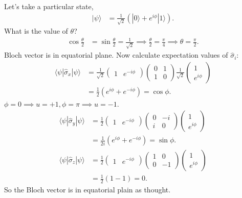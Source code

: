 \documentclass[lasers.tex]{subfiles}
\begin{document}
\begin{example}
    Let's take a particular state,
    \begin{align}
        |\psi\rangle &= \frac{1}{\sqrt{2}}\left(|0\rangle+e^{i\phi}|1\rangle\right).
    \end{align}
    What is the value of $\theta$?
    \begin{align}
        \cos\frac{\theta}{2} &= \sin\frac{\theta}{2} = \frac{1}{\sqrt{2}} \implies \frac{\theta}{2} = \frac{\pi}{4} \implies \theta = \frac{\pi}{2}.
    \end{align}
    Bloch vector is in equatorial plane. 
    Now calculate expectation values of $\hat{\sigma}_i$:
    \begin{align}
        \langle\psi|\hat{\sigma}_x|\psi\rangle &= \frac{1}{\sqrt{2}}\begin{pmatrix} 1 & e^{-i\phi}\end{pmatrix}\begin{pmatrix}0 & 1 \\ 1 & 0 \end{pmatrix}\frac{1}{\sqrt{2}}\begin{pmatrix}1 \\ e^{i\phi}\end{pmatrix} \\
                                               &= \frac12\left(e^{i\phi}+e^{-i\phi}\right) = \cos\phi.
    \end{align}
    $\phi=0\implies u=+1, \phi=\pi \implies u=-1$.
    \begin{align}
        \langle\psi|\hat{\sigma}_y|\psi\rangle &= \frac12\begin{pmatrix}1 & e^{-i\phi}\end{pmatrix}\begin{pmatrix}0 & -i \\ i & 0\end{pmatrix}\begin{pmatrix} 1 \\ e^{i\phi}\end{pmatrix} \\
                                               &= \frac{1}{2i}\left(e^{i\phi}+e^{-i\phi}\right) = \sin\phi. \\
        \langle\psi|\hat{\sigma}_z|\psi\rangle &= \frac12\begin{pmatrix} 1 & e^{-i\phi}\end{pmatrix}\begin{pmatrix}1 & 0 \\ 0 & -1\end{pmatrix}\begin{pmatrix}1 \\ e^{i\phi}\end{pmatrix} \\
                                               &= \frac12\left(1-1\right) = 0.
    \end{align}
    So the Bloch vector is in equatorial plain as thought. 
\end{example}
\end{document}
